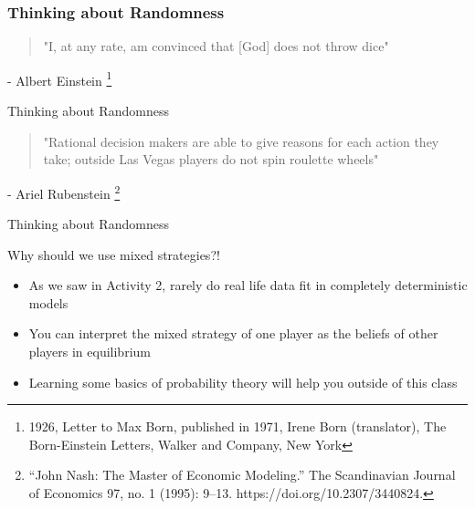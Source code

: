 

\begin{frame}
\frametitle{Thinking about Randomness}
  \begin{quote}
    "I, at any rate, am convinced that [God] does not throw dice"
  \end{quote}

  - Albert Einstein 
  \footnote{1926, Letter to Max Born, published in 1971, Irene Born (translator), The Born-Einstein Letters, Walker and Company, New York}
\end{frame}


\begin{frame}{Thinking about Randomness}
  \begin{quote}
    "Rational decision makers are able to give reasons for each action they take;
    outside Las Vegas players do not spin roulette wheels"
  \end{quote}

  - Ariel Rubenstein
  \footnote{“John Nash: The Master of Economic Modeling.” The Scandinavian Journal of Economics 97, no. 1 (1995): 9–13. https://doi.org/10.2307/3440824.}
\end{frame}


\begin{frame}{Thinking about Randomness}
  
  Why should we use mixed strategies?!
  
  \begin{itemize}
    
    \item As we saw in Activity 2, 
    rarely do real life data fit in completely deterministic models

    \item You can interpret the mixed strategy of one player as the beliefs of other players in equilibrium

    \item Learning some basics of probability theory will help you outside of this class

  \end{itemize}
\end{frame}


